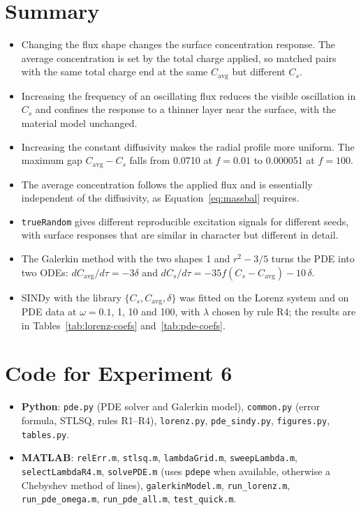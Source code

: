 \documentclass[11pt,a4paper]{article}
\newcommand{\avg}{\mathrm{avg}}
\begin{document}
\section{Summary}
\begin{itemize}
  \item Changing the flux shape changes the surface concentration response. The average concentration is set by the total charge applied, so matched pairs with the same total charge end at the same $C_\avg$ but different $C_s$.
  \item Increasing the frequency of an oscillating flux reduces the visible oscillation in $C_s$ and confines the response to a thinner layer near the surface, with the material model unchanged.
  \item Increasing the constant diffusivity makes the radial profile more uniform. The maximum gap $C_\avg-C_s$ falls from 0.0710 at $f=0.01$ to 0.000051 at $f=100$.
  \item The average concentration follows the applied flux and is essentially independent of the diffusivity, as Equation~\eqref{eq:massbal} requires.
  \item \texttt{trueRandom} gives different reproducible excitation signals for different seeds, with surface responses that are similar in character but different in detail.
  \item The Galerkin method with the two shapes 1 and $r^2-3/5$ turns the PDE into two ODEs: $dC_\avg/d\tau=-3\delta$ and $dC_s/d\tau=-35f(C_s-C_\avg)-10\,\delta$.
  \item SINDy with the library $\{C_s,C_\avg,\delta\}$ was fitted on the Lorenz system and on PDE data at $\omega=0.1$, 1, 10 and 100, with $\lambda$ chosen by rule R4; the results are in Tables~\ref{tab:lorenz-coefs} and~\ref{tab:pde-coefs}.
\end{itemize}

\appendix\sloppy
\section{Code for Experiment 6}
\begin{itemize}
  \item \textbf{Python}: \texttt{pde.py} (PDE solver and Galerkin model), \texttt{common.py} (error formula, STLSQ, rules R1--R4), \texttt{lorenz.py}, \texttt{pde\_sindy.py}, \texttt{figures.py}, \texttt{tables.py}.
  \item \textbf{MATLAB}: \texttt{relErr.m}, \texttt{stlsq.m}, \texttt{lambdaGrid.m}, \texttt{sweepLambda.m}, \texttt{selectLambdaR4.m}, \texttt{solvePDE.m} (uses \texttt{pdepe} when available, otherwise a Chebyshev method of lines), \texttt{galerkinModel.m}, \texttt{run\_lorenz.m}, \texttt{run\_pde\_omega.m}, \texttt{run\_pde\_all.m}, \texttt{test\_quick.m}.
\end{itemize}
\end{document}
